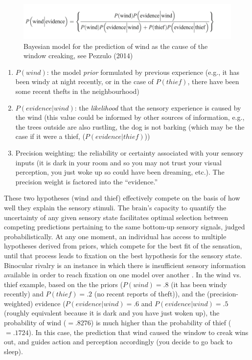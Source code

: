 \begin{CJK}{UTF8}{gbsn}
\begin{figure}[htbp]
  \begin{center}
    \includegraphics[scale=.5]{images/windThief.png}
      \caption{Bayesian model for the prediction of wind as the cause of the window creaking, see Pezzulo (2014)}
        \label{fig:windThief}
   \end{center}
\end{figure}


\begin{enumerate}
  \item $P(wind)$: the model \textit{prior} formulated by previous experience (e.g., it has been windy at night recently, or in the case of $P(thief)$, there have been some recent thefts in the neighbourhood)
  \item $P(evidence|wind)$: the \textit{likelihood} that the sensory experience is caused by the wind (this value could be informed by other sources of information, e.g., the trees outside are also rustling, the dog is not barking (which may be the case if it were a thief, ($P(evidence|thief)$))
  \item Precision weighting: the reliability or certainty associated with your sensory inputs (it is dark in your room and so you may not trust your visual perception, you just woke up so could have been dreaming, etc.).  The precision weight is factored into the ``evidence.''
\end{enumerate}

These two hypotheses (wind and thief) effectively compete on the basis of how well they explain the sensory stimuli.  The brain's capacity to quantify the uncertainty of any given sensory state facilitates optimal selection between competing predictions pertaining to the same bottom-up sensory signals, judged probabilistically.  At any one moment, an individual has access to multiple hypotheses derived from priors, which compete for the best fit of the sensation, until that process leads to fixation on the best hypothesis for the sensory state.  Binocular rivalry is an instance in which there is insufficient sensory information available in order to reach fixation on one model over another \citep[for example, looking at a necker cube, see Figure ~\ref{fig:neckerCube}][]{Frith2007}.  In the wind vs. thief example, based on the the priors ($P(wind) = .8$ (it has been windy recently) and $P(thief) = .2$ (no recent reports of theft)), and the (precision-weighted) evidence ($P(evidence|wind) = .6$ and $P(evidence|wind) = .5$ (roughly equivalent because it is dark and you have just woken up), the probability of wind ($= .8276$) is much higher than the probability of thief ($= .1724$).  In this case, the prediction that wind caused the window to creak wins out, and guides action and perception accordingly (you decide to go back to sleep).


\end{CJK}
